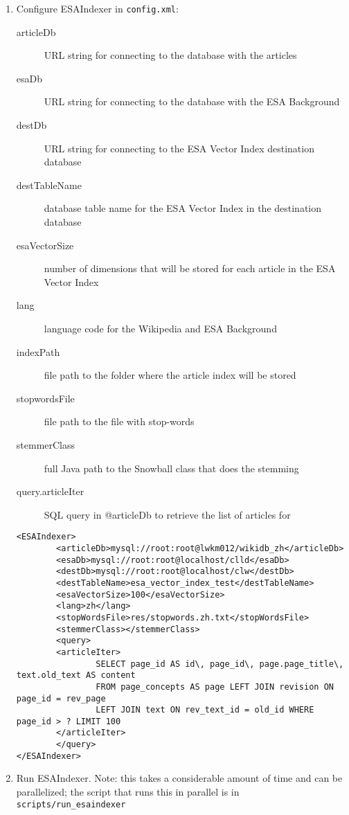 \documentclass{article}
\begin{document}
\begin{enumerate}
\item Configure ESAIndexer in \verb|config.xml|:
  \begin{description}
    \item[articleDb] URL string for connecting to the database with the articles
  \item[esaDb] URL string for connecting to the database with the ESA Background
  \item[destDb] URL string for connecting to the ESA Vector Index destination database
  \item[destTableName] database table name for the ESA Vector Index in the destination database
  \item[esaVectorSize] number of dimensions that will be stored for each article in the ESA Vector Index
  \item[lang] language code for the Wikipedia and ESA Background
    \item[indexPath] file path to the folder where the article index will be stored
    \item[stopwordsFile] file path to the file with stop-words
    \item[stemmerClass] full Java path to the Snowball class that does the stemming
    \item[query.articleIter] SQL query in @articleDb to retrieve the list of articles for 
  \end{description}
\begin{verbatim}
<ESAIndexer>
        <articleDb>mysql://root:root@lwkm012/wikidb_zh</articleDb>
        <esaDb>mysql://root:root@localhost/clld</esaDb>
        <destDb>mysql://root:root@localhost/clw</destDb>
        <destTableName>esa_vector_index_test</destTableName>
        <esaVectorSize>100</esaVectorSize>
        <lang>zh</lang>
        <stopWordsFile>res/stopwords.zh.txt</stopWordsFile>
        <stemmerClass></stemmerClass>
        <query>
        <articleIter>
                SELECT page_id AS id\, page_id\, page.page_title\, text.old_text AS content 
                FROM page_concepts AS page LEFT JOIN revision ON page_id = rev_page 
                LEFT JOIN text ON rev_text_id = old_id WHERE page_id > ? LIMIT 100
        </articleIter>
        </query>
</ESAIndexer>
\end{verbatim}
\item Run ESAIndexer. Note: this takes a considerable amount of time and can be parallelized; the script that runs this in parallel is in \texttt{scripts/run\_esaindexer}

\end{enumerate}
\end{document}
